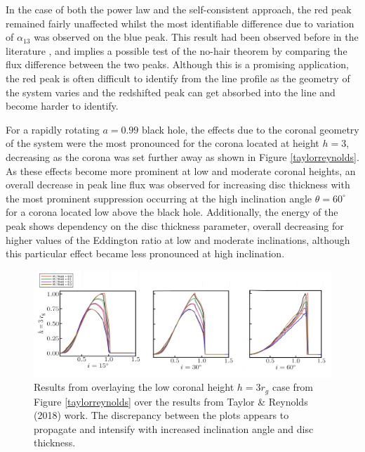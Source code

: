 \documentclass[fleqn,usenatbib,useAMS]{mnras}
\begin{document}
In the case of both the power law and the self-consistent approach, the red peak remained fairly unaffected whilst the most identifiable difference due to variation of $\alpha_{13}$ was observed on the blue peak. This result had been observed before in the literature \cite{johannsen2014x}, \cite{johannsen2013testing} and implies a possible test of the no-hair theorem by comparing the flux difference between the two peaks. Although this is a promising application, the red peak is often difficult to identify from the line profile as the geometry of the system varies and the redshifted peak can get absorbed into the line and become harder to identify. 

For a rapidly rotating $a = 0.99$ black hole, the effects due to the coronal geometry of the system were the most pronounced for the corona located at height $h = 3$, decreasing as the corona was set further away as shown in Figure \ref{taylorreynolds}. As these effects become more prominent at low and moderate coronal heights, an overall decrease in peak line flux was observed for increasing disc thickness with the most prominent suppression occurring at the high inclination angle $\theta = 60^{\circ}$ for a corona located low above the black hole. Additionally, the energy of the peak shows dependency on the disc thickness parameter, overall decreasing for higher values of the Eddington ratio at low and moderate inclinations, although this particular effect became less pronounced at high inclination.

\begin{figure}[!h]
    \centering
    \includegraphics[width=0.98\linewidth]{figures/overlay.png}
    \caption{Results from overlaying the low coronal height $h = 3 r_{g}$ case from Figure \ref{taylorreynolds} over the results from Taylor \& Reynolds (2018) \cite{taylor2018exploring} work. The discrepancy between the plots appears to propagate and intensify with increased inclination angle and disc thickness.}
    \label{overlay}
\end{figure}
\end{document}

